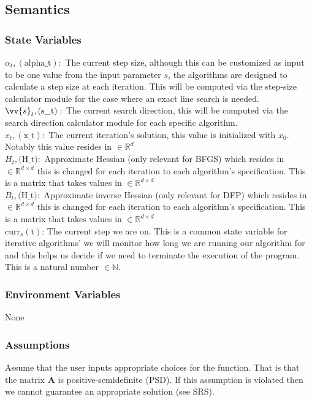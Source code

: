 \documentclass[12pt, titlepage]{article}
\begin{document}
\subsection{Semantics}
\subsubsection{State Variables}
$\alpha_t, (\text{alpha\_t}): $ The current step size, although this can be customized as input to be one value from the input parameter $s$, the algorithms are designed to calculate a step size at each iteration. This will be computed via the step-size calculator module for the case where an exact line search is needed.
\\
$\vv{s}_t, (\text{s\_t}): $ The current search direction, this will be computed via the search direction calculator module for each specific algorithm.
\\
$x_{t}, (\text{x\_t}):$ The current iteration's solution, this value is initialized with $x_0$. Notably this value resides in $ \in \mathbb{R}^d$
\\
$H_{t}, (\text{H\_t)}:$ Approximate Hessian (only relevant for BFGS) which resides in $ \in \mathbb{R}^{d \times d}$ this is changed for each iteration to each algorithm's specification. This is a matrix that takes values in $\in \mathbb{R}^{d \times d}$
\\
$B_{t}, (\text{H\_t)}:$ Approximate inverse Hessian (only relevant for DFP) which resides in $ \in \mathbb{R}^{d \times d}$ this is changed for each iteration to each algorithm's specification. This is a matrix that takes values in $\in \mathbb{R}^{d \times d}$
\\
$\text{curr}_{s} (\text{t})$: The current step we are on. This is a common state variable for iterative algorithms' we will monitor how long we are running our algorithm for and this helps us decide if we need to terminate the execution of the program. This is a natural number $\in \mathbb{N}$.

\subsubsection{Environment Variables}
None
\subsubsection{Assumptions}

Assume that the user inputs appropriate choices for the function. That is that the matrix $\mathbf{A}$ is positive-semidefinite (PSD). If this assumption is violated then we cannot guarantee an appropriate solution (see SRS). 
\end{document}
